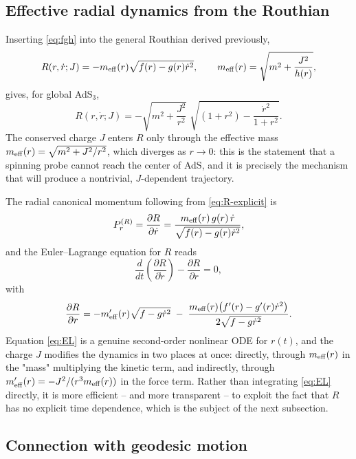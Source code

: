 \documentclass[11pt]{article}
\begin{document}
\subsection{Effective radial dynamics from the Routhian}
\label{subsec:routhian-dynamics}

Inserting \eqref{eq:fgh} into the general Routhian derived previously,
\begin{equation}
R(r,\dot r;J) = -m_{\rm eff}(r)\sqrt{f(r)-g(r)\dot r^2},
\qquad
m_{\rm eff}(r) = \sqrt{m^2+\frac{J^2}{h(r)}},
\end{equation}
gives, for global AdS$_3$,
\begin{equation}
R(r,\dot r;J) = -\sqrt{m^2+\frac{J^2}{r^2}}\;\sqrt{(1+r^2)-\frac{\dot r^2}{1+r^2}} .
\label{eq:R-explicit}
\end{equation}
The conserved charge $J$ enters $R$ only through the effective mass $m_{\rm eff}(r)=\sqrt{m^2+J^2/r^2}$, which diverges as $r\to0$: this is the statement that a spinning probe cannot reach the center of AdS, and it is precisely the mechanism that will produce a nontrivial, $J$-dependent trajectory.

The radial canonical momentum following from \eqref{eq:R-explicit} is
\begin{equation}
P_r^{(R)} = \frac{\partial R}{\partial \dot r}
= \frac{m_{\rm eff}(r)\,g(r)\,\dot r}{\sqrt{f(r)-g(r)\dot r^2}} ,
\label{eq:Pr-explicit}
\end{equation}
and the Euler--Lagrange equation for $R$ reads
\begin{equation}
\frac{d}{dt}\!\left(\frac{\partial R}{\partial \dot r}\right) - \frac{\partial R}{\partial r} = 0 ,
\label{eq:EL}
\end{equation}
with
\begin{equation}
\frac{\partial R}{\partial r}
= -m_{\rm eff}'(r)\sqrt{f-g\dot r^2}
\;-\; \frac{m_{\rm eff}(r)\big(f'(r)-g'(r)\dot r^2\big)}{2\sqrt{f-g\dot r^2}} .
\end{equation}
Equation \eqref{eq:EL} is a genuine second-order nonlinear ODE for $r(t)$, and the charge $J$ modifies the dynamics in two places at once: directly, through $m_{\rm eff}(r)$ in the "mass" multiplying the kinetic term, and indirectly, through $m_{\rm eff}'(r)=-J^2/(r^3 m_{\rm eff}(r))$ in the force term. Rather than integrating \eqref{eq:EL} directly, it is more efficient -- and more transparent -- to exploit the fact that $R$ has no explicit time dependence, which is the subject of the next subsection.

\subsection{Connection with geodesic motion}
\label{subsec:geodesic-connection}
\end{document}
